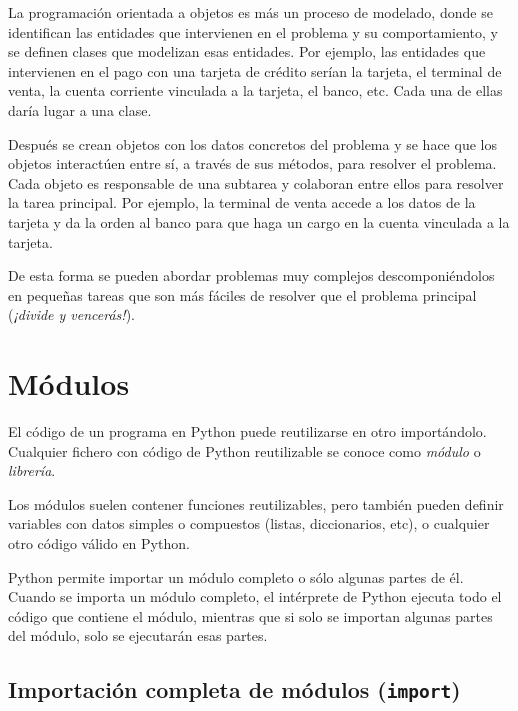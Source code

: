 \documentclass[
  spanish,
  a4paper,
]{scrreport}
\begin{document}
La programación orientada a objetos es más un proceso de modelado, donde
se identifican las entidades que intervienen en el problema y su
comportamiento, y se definen clases que modelizan esas entidades. Por
ejemplo, las entidades que intervienen en el pago con una tarjeta de
crédito serían la tarjeta, el terminal de venta, la cuenta corriente
vinculada a la tarjeta, el banco, etc. Cada una de ellas daría lugar a
una clase.

Después se crean objetos con los datos concretos del problema y se hace
que los objetos interactúen entre sí, a través de sus métodos, para
resolver el problema. Cada objeto es responsable de una subtarea y
colaboran entre ellos para resolver la tarea principal. Por ejemplo, la
terminal de venta accede a los datos de la tarjeta y da la orden al
banco para que haga un cargo en la cuenta vinculada a la tarjeta.

De esta forma se pueden abordar problemas muy complejos
descomponiéndolos en pequeñas tareas que son más fáciles de resolver que
el problema principal (\emph{¡divide y vencerás!}).


\chapter{Módulos}\label{muxf3dulos}

El código de un programa en Python puede reutilizarse en otro
importándolo. Cualquier fichero con código de Python reutilizable se
conoce como \emph{módulo} o \emph{librería}.

Los módulos suelen contener funciones reutilizables, pero también pueden
definir variables con datos simples o compuestos (listas, diccionarios,
etc), o cualquier otro código válido en Python.

Python permite importar un módulo completo o sólo algunas partes de él.
Cuando se importa un módulo completo, el intérprete de Python ejecuta
todo el código que contiene el módulo, mientras que si solo se importan
algunas partes del módulo, solo se ejecutarán esas partes.

\section{\texorpdfstring{Importación completa de módulos
(\texttt{import})}{Importación completa de módulos (import)}}\label{importaciuxf3n-completa-de-muxf3dulos-import}
\end{document}
